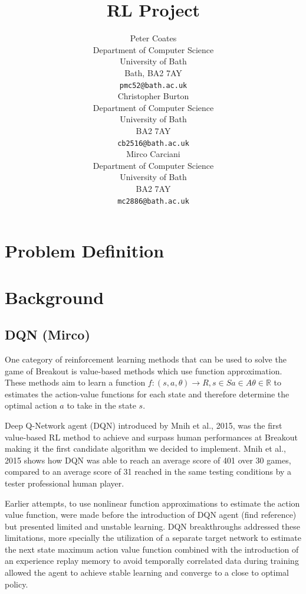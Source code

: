 \documentclass{article}
\title{RL Project}
\author{
  Peter Coates
  \\
  Department of Computer Science\\
  University of Bath\\
  Bath, BA2 7AY \\
  \texttt{pmc52@bath.ac.uk} \\
\And
  Christopher Burton\\
  Department of Computer Science\\
  University of Bath \\
  BA2 7AY\\
  \texttt{cb2516@bath.ac.uk} \\
\And
  Mirco Carciani\\
  Department of Computer Science\\
  University of Bath \\
  BA2 7AY\\
  \texttt{mc2886@bath.ac.uk} \\
}
\begin{document}
\maketitle

\section{Problem Definition}


\section{Background}


\subsection{DQN (Mirco)}
One category of reinforcement learning methods that can be used to solve the game of Breakout is value-based methods which use function approximation.
These methods aim to learn a function $f: (s,a,\theta) \rightarrow R, s \in S  a \in A \theta \in \mathbb{R}$ to estimates the action-value functions for each state and therefore determine the optimal action $a$ to take in the state $s$.

Deep Q-Network agent (DQN) introduced by Mnih et al., 2015, was the first value-based RL method to achieve and surpass human performances at Breakout making it the first candidate algorithm we decided to implement.
Mnih et al., 2015 shows how DQN was able to reach an average score of 401 over 30 games, compared to an average score of 31 reached in the same testing conditions by a tester professional human player.

Earlier attempts, to use nonlinear function approximations to estimate the action value function, were made before the introduction of DQN agent (find reference) but presented limited and unstable learning.
DQN breakthroughs addressed these limitations, more specially the utilization of a separate target network to estimate the next state maximum action value function combined with the introduction of an experience replay memory to avoid temporally correlated data during training allowed the agent to achieve stable learning and converge to a close to optimal policy.
\end{document}

